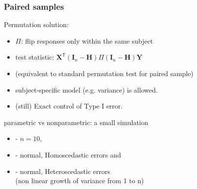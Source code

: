 \documentclass[xcolor={pdftex,dvipsnames,table}]{beamer}
\newcommand{\bb}[1]{\begin{block}{#1}}
\newcommand{\eb}{\end{block}}
\newcommand{\bi}{\begin {itemize}}
\newcommand{\ei}{\end{itemize}}
\newcommand{\Perm}{\Pi}
\newcommand{\IH}{(\mathbf{I}_n-\mathbf{H})}
\begin{document}
\begin{frame}[fragile]
\frametitle{Paired samples}
\bb{Permutation solution:}
\bi 
\item $\Perm$: flip responses only \textcolor{myblue}{within} the same subject
\item test statistic: $\mathbf{X}^\mathsf{T} \IH\Perm\IH\mathbf{Y}$
\item (equivalent to standard permutation test for paired sample)
\item subject-specific model (e.g. variance) is allowed.
\item (still) Exact control of Type I error.
\ei
\eb
\pause
\bb{parametric vs nonparametric: a small simulation}
\bi
\item[-] $n=10$, 
\item[-] normal, Homoscedastic  errors and 
\item[-] normal, Heteroscedastic  errors  \\
(non linear growth of variance from 1 to n)
\ei
\eb
\end{frame}
\end{document}
